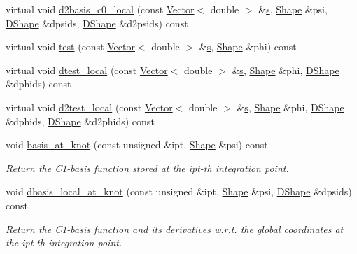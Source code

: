 \begin{DoxyCompactItemize}
virtual void \hyperlink{classoomph_1_1BellElementBase_aa9db3995e26ddee02bdae16dae111c03}{d2basis\+\_\+c0\+\_\+local} (const \hyperlink{classoomph_1_1Vector}{Vector}$<$ double $>$ \&\hyperlink{cfortran_8h_ab7123126e4885ef647dd9c6e3807a21c}{s}, \hyperlink{classoomph_1_1Shape}{Shape} \&psi, \hyperlink{classoomph_1_1DShape}{D\+Shape} \&dpsids, \hyperlink{classoomph_1_1DShape}{D\+Shape} \&d2psids) const
\item 
virtual void \hyperlink{classoomph_1_1BellElementBase_a76ddb90394c979f9967e8fd068bdf220}{test} (const \hyperlink{classoomph_1_1Vector}{Vector}$<$ double $>$ \&\hyperlink{cfortran_8h_ab7123126e4885ef647dd9c6e3807a21c}{s}, \hyperlink{classoomph_1_1Shape}{Shape} \&phi) const
\item 
virtual void \hyperlink{classoomph_1_1BellElementBase_aab180be9cd6347005c5505bedf673db2}{dtest\+\_\+local} (const \hyperlink{classoomph_1_1Vector}{Vector}$<$ double $>$ \&\hyperlink{cfortran_8h_ab7123126e4885ef647dd9c6e3807a21c}{s}, \hyperlink{classoomph_1_1Shape}{Shape} \&phi, \hyperlink{classoomph_1_1DShape}{D\+Shape} \&dphids) const
\item 
virtual void \hyperlink{classoomph_1_1BellElementBase_ae576f35c4faeeed475dff67a8b31ac37}{d2test\+\_\+local} (const \hyperlink{classoomph_1_1Vector}{Vector}$<$ double $>$ \&\hyperlink{cfortran_8h_ab7123126e4885ef647dd9c6e3807a21c}{s}, \hyperlink{classoomph_1_1Shape}{Shape} \&phi, \hyperlink{classoomph_1_1DShape}{D\+Shape} \&dphids, \hyperlink{classoomph_1_1DShape}{D\+Shape} \&d2phids) const
\item 
void \hyperlink{classoomph_1_1BellElementBase_af00e238530de6269b51b57a4357d1dd6}{basis\+\_\+at\+\_\+knot} (const unsigned \&ipt, \hyperlink{classoomph_1_1Shape}{Shape} \&psi) const
\begin{DoxyCompactList}\small\item\em Return the C1-\/basis function stored at the ipt-\/th integration point. \end{DoxyCompactList}\item 
void \hyperlink{classoomph_1_1BellElementBase_a795fca0c9cfa01bf6f966f4f0a69b312}{dbasis\+\_\+local\+\_\+at\+\_\+knot} (const unsigned \&ipt, \hyperlink{classoomph_1_1Shape}{Shape} \&psi, \hyperlink{classoomph_1_1DShape}{D\+Shape} \&dpsids) const
\begin{DoxyCompactList}\small\item\em Return the C1-\/basis function and its derivatives w.\+r.\+t. the global coordinates at the ipt-\/th integration point. \end{DoxyCompactList}\item 

\end{DoxyCompactItemize}

